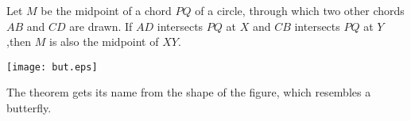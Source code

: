 \documentclass[12pt]{article}
\begin{document}
Let $M$ be the midpoint of a chord $PQ$ of a circle, through which two other chords $AB$ and $CD$ are drawn. If $AD$ intersects $PQ$ at $X$ and
$CB$ intersects $PQ$ at  $Y$,then $M$ is also the midpoint of $XY.$

\begin{center}
\texttt{[image: but.eps]}
\end{center}

The theorem gets its name from the shape of the figure, which resembles a butterfly.
\end{document}
